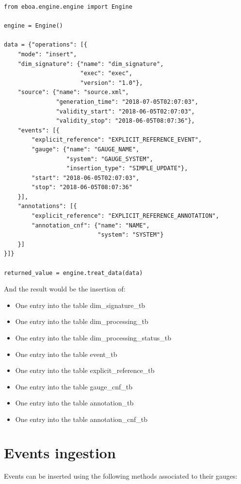 \begin{lstlisting}[style=python]
from eboa.engine.engine import Engine

engine = Engine()

data = {"operations": [{
    "mode": "insert",
    "dim_signature": {"name": "dim_signature",
                      "exec": "exec",
                      "version": "1.0"},
    "source": {"name": "source.xml",
               "generation_time": "2018-07-05T02:07:03",
               "validity_start": "2018-06-05T02:07:03",
               "validity_stop": "2018-06-05T08:07:36"},
    "events": [{
        "explicit_reference": "EXPLICIT_REFERENCE_EVENT",
        "gauge": {"name": "GAUGE_NAME",
                  "system": "GAUGE_SYSTEM",
                  "insertion_type": "SIMPLE_UPDATE"},
        "start": "2018-06-05T02:07:03",
        "stop": "2018-06-05T08:07:36"
    }],
    "annotations": [{
        "explicit_reference": "EXPLICIT_REFERENCE_ANNOTATION",
        "annotation_cnf": {"name": "NAME",
                           "system": "SYSTEM"}
    }]
}]}

returned_value = engine.treat_data(data)
\end{lstlisting}

And the result would be the insertion of:
\begin{itemize}
\item One entry into the table dim\_signature\_tb
\item One entry into the table dim\_processing\_tb
\item One entry into the table dim\_processing\_status\_tb
\item One entry into the table event\_tb
\item One entry into the table explicit\_reference\_tb
\item One entry into the table gauge\_cnf\_tb
\item One entry into the table annotation\_tb
\item One entry into the table annotation\_cnf\_tb
\end{itemize}

\section{Events ingestion}

Events can be inserted using the following methods associated to their gauges:

